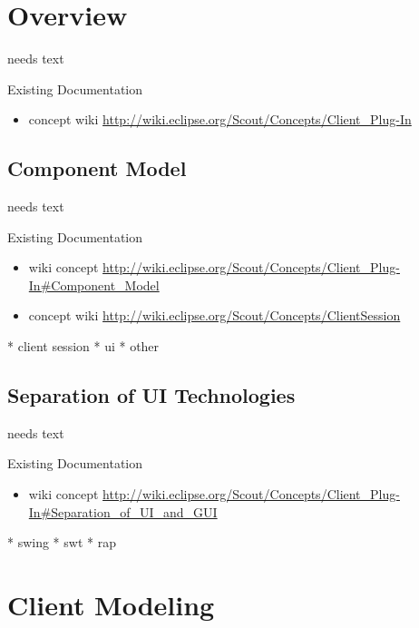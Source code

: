 \documentclass[a4paper,10pt,twoside]{book}
\begin{document}
  \sloppy
\fi


\chapter{Overview}

needs text
  
\noindent Existing Documentation
\begin{itemize}
  \item concept wiki \url{http://wiki.eclipse.org/Scout/Concepts/Client_Plug-In}
\end{itemize}

\section{Component Model}
needs text

\noindent Existing Documentation
\begin{itemize}
  \item wiki concept \url{http://wiki.eclipse.org/Scout/Concepts/Client_Plug-In#Component_Model}
  \item concept wiki \url{http://wiki.eclipse.org/Scout/Concepts/ClientSession}
\end{itemize}

  * client session
  * ui
  * other
  
\section{Separation of UI Technologies}
needs text

\noindent Existing Documentation
\begin{itemize}
  \item wiki concept \url{http://wiki.eclipse.org/Scout/Concepts/Client_Plug-In#Separation_of_UI_and_GUI}
\end{itemize}
  
  * swing
  * swt
  * rap

\chapter{Client Modeling}
\end{document}
